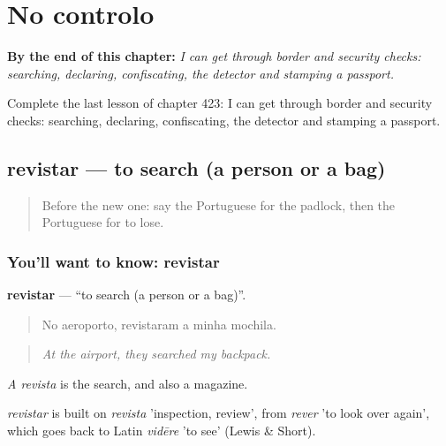 
\chapter{No controlo}
\label{ch:pt-no-controlo}

\begin{chapteropening}
\textbf{By the end of this chapter:} \emph{I can get through border and security checks: searching, declaring, confiscating, the detector and stamping a passport.}

Complete the last lesson of chapter 423: I can get through border and security checks: searching, declaring, confiscating, the detector and stamping a passport.
\end{chapteropening}

\section[revistar]{revistar — to search (a person or a bag)}

\label{lesson:PT-C423-revistar}



\begin{quote}
Before the new one: say the Portuguese for the padlock, then the Portuguese for to lose.
\end{quote}

\subsection*{You'll want to know: revistar}
\textbf{revistar} — \textquotedblleft{}to search (a person or a bag)\textquotedblright{}.

\begin{quote}
No aeroporto, revistaram a minha mochila.
\end{quote}

\begin{quote}
\emph{At the airport, they searched my backpack.}
\end{quote}

\emph{A revista} is the search, and also a magazine.

\begin{cousinweb}
\emph{revistar} is built on \emph{revista} 'inspection, review', from \emph{rever} 'to look over again', which goes back to Latin \emph{vidēre} 'to see' (Lewis \& Short).
\end{cousinweb}

